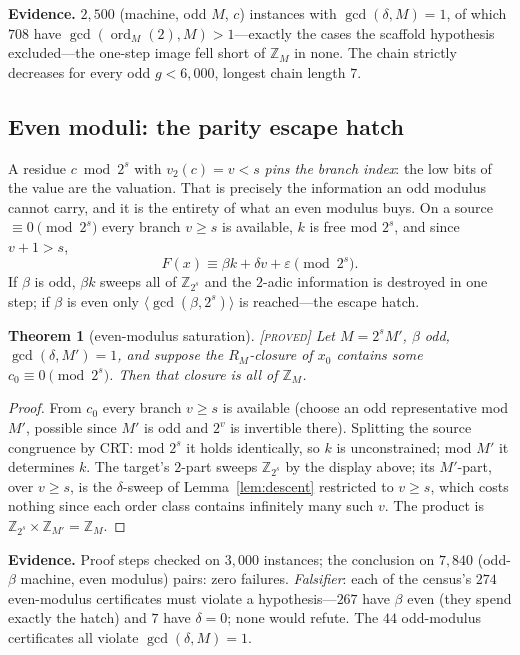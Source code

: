 \documentclass[11pt]{article}
\newtheorem{theorem}{Theorem}[section]
\theoremstyle{definition}
\theoremstyle{remark}
\newenvironment{evidence}
  {\par\smallskip\noindent\footnotesize\textbf{Evidence.}}
  {\par\smallskip}
\newcommand{\Z}{\mathbb{Z}}
\newcommand{\ord}{\operatorname{ord}}
\newcommand{\vp}[1]{v_{#1}}
\newcommand{\Proved}{\textsc{[proved]}}
\begin{document}
\begin{evidence}
$2{,}500$ (machine, odd $M$, $c$) instances with $\gcd(\delta,M)=1$, of which
$708$ have $\gcd(\ord_M(2),M)>1$---exactly the cases the scaffold hypothesis
excluded---the one-step image fell short of $\Z_M$ in none.  The chain
strictly decreases for every odd $g<6{,}000$, longest chain length $7$.
\end{evidence}

\subsection{Even moduli: the parity escape hatch}
\label{sec:even}

A residue $c\bmod 2^{s}$ with $\vp{2}(c)=v<s$ \emph{pins the branch index}: the
low bits of the value are the valuation.  That is precisely the information an
odd modulus cannot carry, and it is the entirety of what an even modulus buys.
On a source $\equiv0\pmod{2^{s}}$ every branch $v\ge s$ is available, $k$ is
free mod $2^{s}$, and since $v+1>s$,
\[
F(x)\equiv \beta k+\delta v+\varepsilon \pmod{2^{s}} .
\]
If $\beta$ is odd, $\beta k$ sweeps all of $\Z_{2^{s}}$ and the $2$-adic
information is destroyed in one step; if $\beta$ is even only
$\langle\gcd(\beta,2^{s})\rangle$ is reached---the escape hatch.

\begin{theorem}[even-modulus saturation]\label{thm:t14}
\Proved{}\; Let $M=2^{s}M'$, $\beta$ odd, $\gcd(\delta,M')=1$, and suppose the
$R_M$-closure of $x_0$ contains some $c_0\equiv0\pmod{2^{s}}$.  Then that
closure is all of $\Z_M$.
\end{theorem}

\begin{proof}
From $c_0$ every branch $v\ge s$ is available (choose an odd representative mod
$M'$, possible since $M'$ is odd and $2^{v}$ is invertible there).  Splitting
the source congruence by CRT: mod $2^{s}$ it holds identically, so $k$ is
unconstrained; mod $M'$ it determines $k$.  The target's $2$-part sweeps
$\Z_{2^{s}}$ by the display above; its $M'$-part, over $v\ge s$, is the
$\delta$-sweep of Lemma~\ref{lem:descent} restricted to $v\ge s$, which costs
nothing since each order class contains infinitely many such $v$.  The product
is $\Z_{2^{s}}\times\Z_{M'}=\Z_M$.
\end{proof}

\begin{evidence}
Proof steps checked on $3{,}000$ instances; the conclusion on $7{,}840$
(odd-$\beta$ machine, even modulus) pairs: zero failures.  \emph{Falsifier}:
each of the census's $274$ even-modulus certificates must violate a
hypothesis---$267$ have $\beta$ even (they spend exactly the hatch) and $7$
have $\delta=0$; none would refute.  The $44$ odd-modulus certificates all
violate $\gcd(\delta,M)=1$.
\end{evidence}
\end{document}
